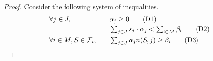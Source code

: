 \begin{proof}
Consider the following system of inequalities.
%
%
%
\begin{alignat}{4}
	& \quad \forall j \in J,   &&\quad  \textstyle \alpha_j  \geq 0 \label{eq:d3} \tag{D1} \\
	& \quad  &&\quad  \textstyle \sum_{j\in J}  s_j\cdot \alpha_j  < \sum_{i\in M}\beta_i \label{eq:d1} \tag{D2}\\
	& \quad \forall i\in M, S\in{\cal F}_i, && \quad \textstyle \sum_{j\in J} \alpha_j n(S,j)  \geq \beta_i  \label{eq:d2}  \tag{D3}
\end{alignat}

\end{proof}
